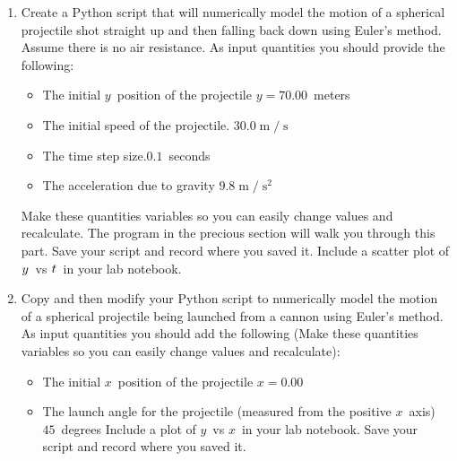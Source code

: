 \documentclass{book}
\begin{document}
\begin{enumerate}
\item {\small Create a Python script that will numerically model the motion of
a spherical projectile shot straight up and then falling back down using
Euler's method. Assume there is no air resistance. As input quantities you
should provide the following:}

\begin{itemize}
\item {\small The initial }$y${\small \ position of the projectile } $y=70.00${\small \ meters}

\item {\small The initial speed of the projectile. }$30.0 \operatorname{m} / \operatorname{s} $

\item {\small The time step size.}$0.1${\small \ seconds}

\item {\small The acceleration due to gravity }$9.8 \operatorname{m} / \operatorname{s} ^{2}$
\end{itemize}

{\small Make these quantities variables so you can easily change values and
recalculate. The program in the precious section will walk you through this part. Save your script and record where you saved it.
Include a scatter plot of }${\small y}${\small \ vs }${\small t}${\small \ in
your lab notebook.}

\item {\small Copy and then modify your Python script to numerically model the
motion of a spherical projectile being launched from a cannon using Euler's
method. As input quantities you should add the following (Make these
quantities variables so you can easily change values and recalculate):}

\begin{itemize}
\item {\small The initial }$x${\small \ position of the projectile }$x=0.00$

\item {\small The launch angle for the projectile (measured from the positive
}$x${\small \ axis) }$45${\small \ degrees Include a plot of }$y${\small \ vs
}$x${\small \ in your lab notebook. Save your script and record where you
saved it.}
\end{itemize}


\end{enumerate}
\end{document}
